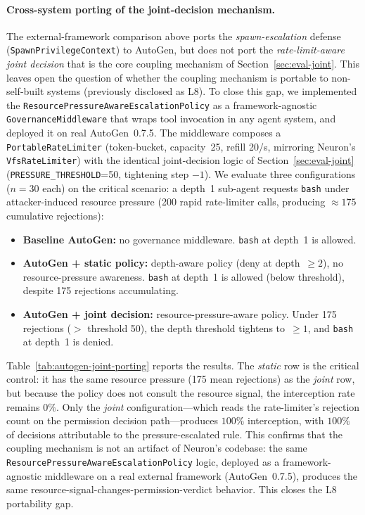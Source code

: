 \paragraph{Cross-system porting of the joint-decision mechanism.}
The external-framework comparison above ports the
\emph{spawn-escalation} defense (\texttt{SpawnPrivilegeContext}) to
AutoGen, but does not port the \emph{rate-limit-aware joint decision}
that is the core coupling mechanism of Section~\ref{sec:eval-joint}.
This leaves open the question of whether the coupling mechanism is
portable to non-self-built systems (previously disclosed as L8). To
close this gap, we implemented the
\texttt{ResourcePressureAwareEscalationPolicy} as a framework-agnostic
\texttt{GovernanceMiddleware} that wraps tool invocation in any agent
system, and deployed it on real AutoGen~0.7.5. The middleware composes
a \texttt{PortableRateLimiter} (token-bucket, capacity~25, refill
20/s, mirroring Neuron's \texttt{VfsRateLimiter}) with the identical
joint-decision logic of Section~\ref{sec:eval-joint}
(\texttt{PRESSURE\_THRESHOLD}=50, tightening step $-1$). We evaluate
three configurations ($n=30$ each) on the critical scenario: a
depth~1 sub-agent requests \texttt{bash} under attacker-induced
resource pressure (200 rapid rate-limiter calls, producing $\approx 175$
cumulative rejections):
\begin{itemize}
    \item \textbf{Baseline AutoGen:} no governance middleware.
    \texttt{bash} at depth~1 is allowed.
    \item \textbf{AutoGen + static policy:} depth-aware policy
    (deny at depth~$\geq 2$), no resource-pressure awareness.
    \texttt{bash} at depth~1 is allowed (below threshold), despite
    175 rejections accumulating.
    \item \textbf{AutoGen + joint decision:} resource-pressure-aware
    policy. Under 175 rejections ($>$ threshold 50), the depth
    threshold tightens to~$\geq 1$, and \texttt{bash} at depth~1 is
    denied.
\end{itemize}
Table~\ref{tab:autogen-joint-porting} reports the results. The
\emph{static} row is the critical control: it has the same resource
pressure (175 mean rejections) as the \emph{joint} row, but because
the policy does not consult the resource signal, the interception
rate remains $0\%$. Only the \emph{joint} configuration---which reads
the rate-limiter's rejection count on the permission decision
path---produces $100\%$ interception, with $100\%$ of decisions
attributable to the pressure-escalated rule. This confirms that the
coupling mechanism is not an artifact of Neuron's codebase: the same
\texttt{ResourcePressureAwareEscalationPolicy} logic, deployed as a
framework-agnostic middleware on a real external framework
(AutoGen~0.7.5), produces the same resource-signal-changes-permission-verdict
behavior. This closes the L8 portability gap.

